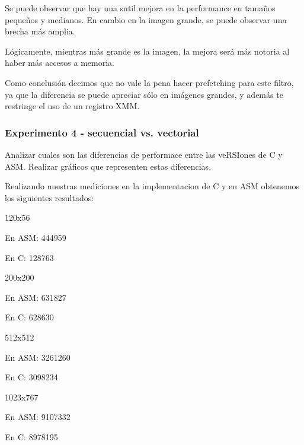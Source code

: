   Se puede observar que hay una sutil mejora en la performance en tamaños pequeños y medianos. 
  En cambio en la imagen grande, se puede observar una brecha más amplia.\vspace*{0.2cm}



  Lógicamente, mientras más grande es la imagen, la mejora será más notoria al haber más accesos a memoria.\vspace*{0.2cm}




  Como conclusión decimos que no vale la pena hacer prefetching para este filtro,
  ya que la diferencia se puede apreciar sólo en imágenes grandes, y además te restringe el uso de un registro XMM.

\vspace*{0.3cm} \noindent
\subsubsection{Experimento 4 - secuencial vs. vectorial}

  Analizar cuales son las diferencias de performace entre las veRSIones de C y ASM. 
  Realizar gráficos que representen estas diferencias.

  
 Realizando nuestras mediciones en la implementacion de C y en ASM obtenemos los siguientes resultados:\vspace*{0.3cm} \noindent
 
\vspace*{0.3cm} \noindent
120x56

En ASM: 444959

En C: 128763


\vspace*{0.3cm} \noindent
200x200

En ASM: 631827

En C: 628630


\vspace*{0.3cm} \noindent
512x512

En ASM: 3261260

En C: 3098234


\vspace*{0.3cm} \noindent
1023x767

En ASM: 9107332

En C: 8978195


\vspace*{0.3cm}

